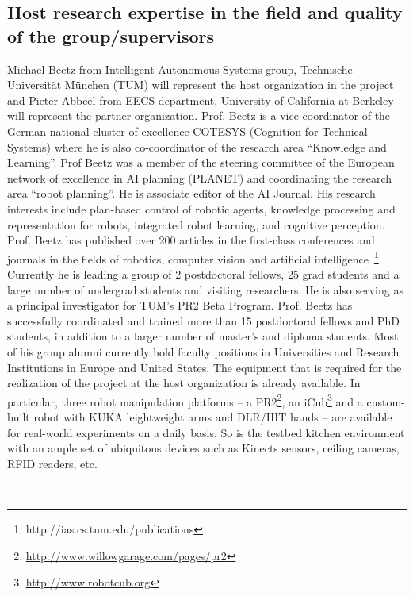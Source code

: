 \subsection{Host research expertise in the field and quality of the group/supervisors}
Michael Beetz from Intelligent Autonomous Systems group, Technische Universit\"at 
M\"unchen (TUM) will represent the host organization in the project and Pieter Abbeel
from EECS department, University of California at Berkeley will represent
the partner organization. 
Prof. Beetz is a vice coordinator of the German national cluster of excellence 
COTESYS (Cognition for Technical Systems) where he is also co-coordinator of the research area 
``Knowledge and Learning''. Prof Beetz was a member of the steering committee of the European 
network of excellence in AI planning (PLANET) and coordinating the research area ``robot planning''. 
He is associate editor of the AI Journal. His research interests include plan-based control of 
robotic agents, knowledge processing and representation for robots, integrated robot learning, and cognitive perception.
Prof. Beetz has published over 200 articles in the first-class conferences and
journals in the fields of robotics, computer vision and artificial 
intelligence~\footnote{http://ias.cs.tum.edu/publications}.
 Currently he is leading a group of 2 postdoctoral fellows, 25 grad students and a large number
of undergrad students and visiting researchers. He is also serving as a principal investigator 
for TUM's PR2 Beta Program. Prof. Beetz has successfully coordinated and trained 
more than 15 postdoctoral fellows and PhD students, in addition to a larger number of 
master's and diploma students. Most of his group alumni currently hold faculty positions in 
Universities and Research Institutions in Europe and United States.
The equipment that is required for the realization of the project at the host organization is already available. In
particular, three robot manipulation platforms -- a PR2\footnote{\url{http://www.willowgarage.com/pages/pr2}}, an
iCub\footnote{\url{http://www.robotcub.org}} and a custom-built robot
with KUKA leightweight arms and DLR/HIT hands -- are available for
real-world experiments on a daily basis. So is the testbed kitchen environment with an ample
set of ubiquitous devices such as Kinects sensors, ceiling cameras, RFID readers, etc.

\\
\begin{multicols}{2}

\end{multicols}
\newpage